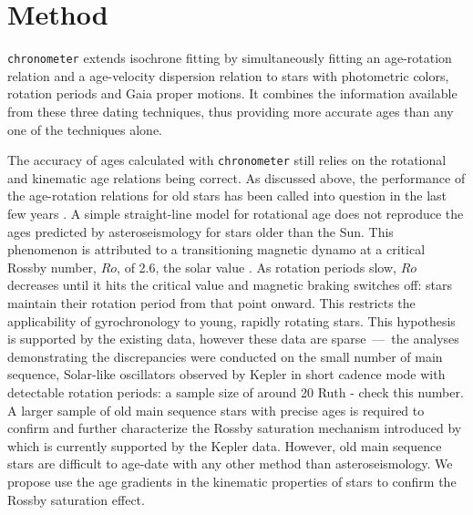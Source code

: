 \documentclass[useAMS, usenatbib, preprint, 12pt]{aastex}
\newcommand{\racomment}[1]{{\color{red}#1}}
\begin{document}
\section{Method}
\label{sec:method}

{\tt chronometer} extends isochrone fitting by simultaneously fitting an
age-rotation relation and a age-velocity dispersion relation to stars with
photometric colors, rotation periods and Gaia proper motions.
It combines the information available from these three dating techniques, thus
providing more accurate ages than any one of the techniques alone.

The accuracy of ages calculated with {\tt chronometer} still relies on the
rotational and kinematic age relations being correct.
As discussed above, the performance of the age-rotation relations for old
stars has been called into question in the last few years \citep{Angus2015,
Vansaders2016, Metcalfe2016}.
A simple straight-line model for rotational age does not reproduce the ages
predicted by asteroseismology for stars older than the Sun.
This phenomenon is attributed to a transitioning magnetic dynamo at a critical
Rossby number, $Ro$, of 2.6, the solar value \citep{Vansaders2016}.
As rotation periods slow, $Ro$ decreases until it hits the critical value and
magnetic braking switches off: stars maintain their rotation period from that
point onward.
This restricts the applicability of gyrochronology to young, rapidly rotating
stars.
This hypothesis is supported by the existing data, however these data are
sparse~---~the analyses demonstrating the discrepancies were conducted on the
small number of main sequence, Solar-like oscillators observed by Kepler in
short cadence mode with detectable rotation periods: a sample size of around
20 \racomment{Ruth - check this number}.
A larger sample of old main sequence stars with precise ages is required to
confirm and further characterize the Rossby saturation mechanism introduced by
\citep{Vansaders2016} which is currently supported by the Kepler data.
However, old main sequence stars are difficult to age-date with any other
method than asteroseismology.
We propose use the age gradients in the kinematic properties of stars to
confirm the Rossby saturation effect.
\end{document}
